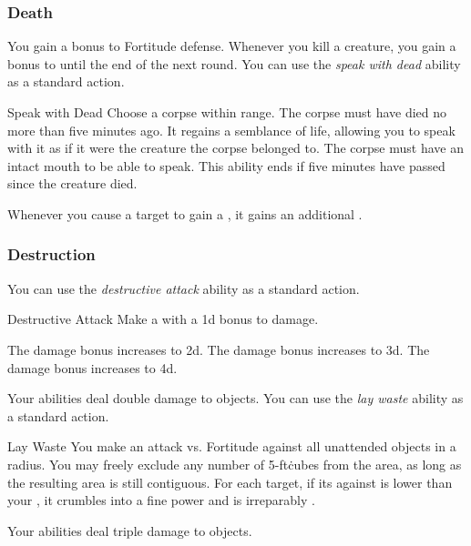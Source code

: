         \subsubsection{Death}
             You gain a  bonus to Fortitude defense.
             Whenever you kill a creature, you gain a  bonus to  until the end of the next round.
             You can use the \textit{speak with dead} ability as a standard action.
            \begin{attuneability}{Speak with Dead}
                Choose a corpse within \rngclose range.
                The corpse must have died no more than five minutes ago.
                It regains a semblance of life, allowing you to speak with it as if it were the creature the corpse belonged to.
                The corpse must have an intact mouth to be able to speak.
                This ability ends if five minutes have passed since the creature died.
            \end{attuneability}
             Whenever you cause a target to gain a , it gains an additional .

        \subsubsection{Destruction}
             You can use the \textit{destructive attack} ability as a standard action.
            \begin{freeability}{Destructive Attack}
                Make a  with a \plus1d bonus to damage.

                \rankline
                 The damage bonus increases to \plus2d.
                 The damage bonus increases to \plus3d.
                 The damage bonus increases to \plus4d.
            \end{freeability}
             Your abilities deal double damage to objects.
             You can use the \textit{lay waste} ability as a standard action.
            \begin{freeability}{Lay Waste}
                You make an attack vs. Fortitude against all unattended objects in a \arealarge radius.
                You may freely exclude any number of 5-ft\. cubes from the area, as long as the resulting area is still contiguous.
                \hit For each target, if its  against  is lower than your , it crumbles into a fine power and is irreparably .
            \end{freeability}
             Your abilities deal triple damage to objects.

